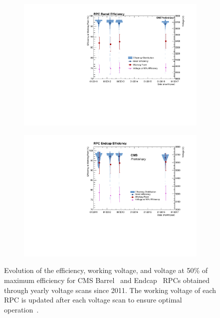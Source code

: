 	\begin{figure}[H]
		\hspace*{-0.05\plotwidth}
		\begin{subfigure}{0.5\linewidth}
			\centering
			\includegraphics[width = 0.7\plotwidth]{fig/chapt4/HVScanSummaryBarrel.pdf}
			\caption{\label{fig:CMSRPCperf:A}}
		\end{subfigure}
		\begin{subfigure}{0.5\linewidth}
			\centering
			\includegraphics[width = 0.7\plotwidth]{fig/chapt4/HVScanSummaryEndcap.pdf}
			\caption{\label{fig:CMSRPCperf:B}}
		\end{subfigure}
		\caption{\label{fig:CMSRPCperf} Evolution of the efficiency, working voltage, and voltage at 50\% of maximum efficiency for CMS Barrel~ and Endcap~ RPCs obtained through yearly voltage scans since 2011. The working voltage of each RPC is updated after each voltage scan to ensure optimal operation~\cite{SHAH2018}.}
	\end{figure}

